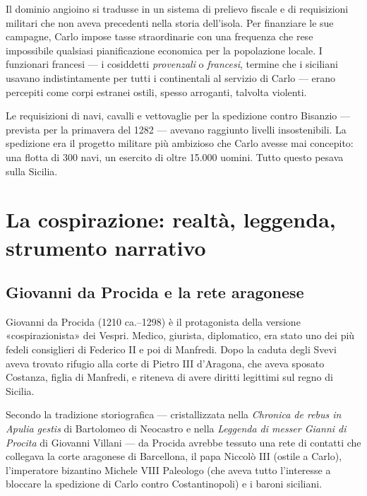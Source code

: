 Il dominio angioino si tradusse in un sistema di prelievo fiscale e di
requisizioni militari che non aveva precedenti nella storia dell'isola.
Per finanziare le sue campagne, Carlo impose tasse straordinarie con una
frequenza che rese impossibile qualsiasi pianificazione economica per
la popolazione locale. I funzionari francesi — i cosiddetti \textit{provenzali}
o \textit{francesi}, termine che i siciliani usavano indistintamente per
tutti i continentali al servizio di Carlo — erano percepiti come corpi
estranei ostili, spesso arroganti, talvolta violenti.


Le requisizioni di navi, cavalli e vettovaglie per la spedizione contro
Bisanzio — prevista per la primavera del 1282 — avevano raggiunto livelli
insostenibili. La spedizione era il progetto militare più ambizioso che
Carlo avesse mai concepito: una flotta di 300 navi, un esercito di oltre
15.000 uomini. Tutto questo pesava sulla Sicilia.

\secsep

\section{La cospirazione: realtà, leggenda, strumento narrativo}

\subsection{Giovanni da Procida e la rete aragonese}

Giovanni da Procida (1210 ca.–1298) è il protagonista della versione
«cospirazionista» dei Vespri. Medico, giurista, diplomatico, era stato
uno dei più fedeli consiglieri di Federico II e poi di Manfredi. Dopo
la caduta degli Svevi aveva trovato rifugio alla corte di Pietro III
d'Aragona, che aveva sposato Costanza, figlia di Manfredi, e riteneva
di avere diritti legittimi sul regno di Sicilia.

Secondo la tradizione storiografica — cristallizzata nella \textit{Chronica
de rebus in Apulia gestis} di Bartolomeo di Neocastro e nella
\textit{Leggenda di messer Gianni di Procita} di Giovanni Villani — da
Procida avrebbe tessuto una rete di contatti che collegava la corte
aragonese di Barcellona, il papa Niccolò III (ostile a Carlo), l'imperatore
bizantino Michele VIII Paleologo (che aveva tutto l'interesse a bloccare
la spedizione di Carlo contro Costantinopoli) e i baroni siciliani.

